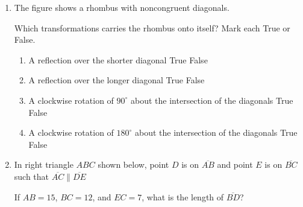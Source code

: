 \documentclass[12pt, twoside]{article}
\begin{document}
\begin{enumerate}
    \item The figure shows a rhombus with noncongruent diagonals.
      \begin{center}
      \end{center}
    Which transformations carries the rhombus onto itself? Mark each True or False.
      \begin{enumerate}
        \item A reflection over the shorter diagonal \hfill True \quad False
        \item A reflection over the longer diagonal \hfill True \quad False
        \item A clockwise rotation of $90^\circ$ about the intersection of the diagonals \hfill True \quad False
        \item A clockwise rotation of $180^\circ$ about the intersection of the diagonals \hfill True \quad False
      \end{enumerate}
\newpage
    \item In right triangle $ABC$ shown below, point $D$ is on $\overline{AB}$ and point $E$ is on $\overline{BC}$ such that $\overline{AC} \parallel \overline{DE}$
      \begin{center}
      \end{center}
    If $AB=15$, $BC=12$, and $EC=7$, what is the length of $\overline{BD}$?



\end{enumerate}
\end{document}
